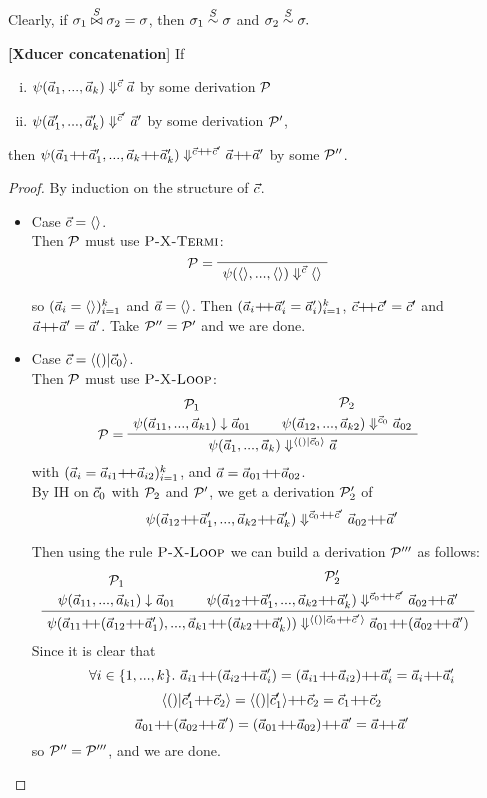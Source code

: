 Clearly, if $\sigma_1 \stackrel{S}{\bowtie} \sigma_2 = \sigma$, 
	then $\sigma_1 \stackrel{S}{\sim} \sigma$ and $\sigma_2 \stackrel{S}{\sim} \sigma.$



\begin{lem}\textbf{[Xducer concatenation}] \label{lem-psi-join}
	If \begin{enumerate}[(i)]
	 \item $\psi(\vec a_{1},...,\vec a_{k}) \Downarrow^{\vec c} \vec a$ by some derivation $\mathcal{P}$
	 \item $\psi(\vec a'_{1},...,\vec a'_{k}) \Downarrow^{\vec c'} \vec a'$ by some derivation $\mathcal{P}'$,
	\end{enumerate}
	then $\sevalfg{\lcall}{\a_{1} {\++} \a'_{1},...,\a_{k} {\++} \a'_{k}}{\c {\++} \c'}{\a {\++} \a'}$ by some $\mathcal{P}''$.
\end{lem}

\begin{proof}
\def\cc{\c {\++} \c'}
\def\aap#1{\a_{#1} {\++} \a_{#1}'}

	By induction on the structure of $\vec c$. 
	\begin{itemize}
		\item Case $\vec c = \langle \rangle$. \\
		Then $\mathcal{P}$ must use $\textsc{P-X-Termi}$:
		$$\PT{\LeLa{\MP = }
			  \Axiom{\sevalf{\emptyv}{\emptyv}{\c}{\emptyv}}
		  }$$
		
		so $(\vec a_i=\langle \rangle)^k_{i=1}$ and $\vec a = \langle \rangle$.
		Then $\k{\aap{i} = \a_i'}$, $\cc = \c' $ and $\a {\++} \a' = \a'$. Take $\mathcal{P}''
		= \mathcal{P}'$ and we are done. 
		
		\item Case $\c = \< () | \c_0 \'>$. \\ 
		Then $\mathcal{P}$ must use $\textsc{P-X-Loop}$: 
		$$
		\PT{
			\UCN{\MP_1}{\block{\a_{11}}{\a_{k1}}{\a_{01}}}
			\UCN{\MP_2}{\sevalf{\a_{12}}{\a_{k2}}{\c_0}{\a_{02}}}
 			\LeLa{\MP = }
			\BC{\sevalf{\a_1}{\a_k}{\< () | \c_0 \'>}{\a}}
		}$$
	    with $\k{\a_i = \vapp{\a_{i1}}{\a_{i2}}}$, and $\a = \a_{01} {\++} \a_{02}$.\\
	    
	    By IH on $\vec c_0$ with $\mathcal{P}_2$ and $\mathcal{P}'$, we get a derivation $\mathcal{P}'_2$ of 
	    $$\sevalfg{\lcall}{\a_{12} {\++} \a_1',...,\a_{k2} {\++} \a_k'}{\c_0 {\++} \c' }{\a_{02} {\++} \a'}$$
	    
	    Then using the rule $\textsc{P-X-Loop}$ we can build a derivation $\mathcal{P}'''$ as follows:
	    	$$
	    \PT{
	    	\UCN{\MP_{1}}{\block{\a_{11}}{\a_{k1}}{\a_{01}}}
	    	\UCN{\MP'_{2}}{\sevalfg{\lcall}{\a_{12} {\++} \a_1',...,\a_{k2} {\++} \a_k'}{\c_0 {\++} \c' }{\a_{02} {\++} \a'}}
	    	\BC{\sevalf{\a_{11} {\++} {(\a_{12} {\++} \a_1')}}
	    		        {\a_{k1} {\++} {(\a_{k2} {\++} \a_k')}}
	    		        {\< () | \c_0 {\++} \c' \'>}
	    		        {\a_{01} {\++} {(\a_{02} {\++} \a')}}}
	    }$$
	    Since it is clear that 
	    $$\forall i \in \{1,...,k\}. \ \a_{i1} {\++} (\a_{i2} {\++} \a_i') = (\a_{i1} {\++} \a_{i2}) {\++} \a_i' = \a_i {\++} \a_i' $$
	    $$ \< () | \c_1' {\++} \c_2 \'> = \< () | \c_1' \'> {\++} \c_2 = \c_1 {\++} \c_2 $$
	    $$ \a_{01} {\++} (\a_{02} {\++} \a') = (\a_{01} {\++} \a_{02}) {\++} \a' = \a {\++}  \a' $$
	    so  $\mathcal{P}'' = \mathcal{P}'''$, and we are done. 
	    

\end{itemize}
\end{proof}
